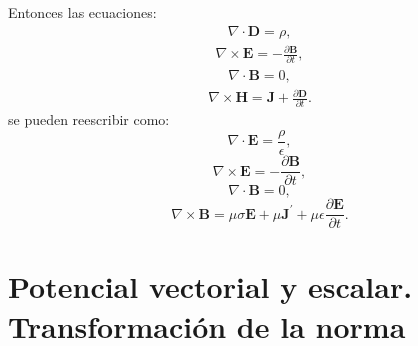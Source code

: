\documentclass[11pt,fleqn]{book} %
\begin{document}
Entonces las ecuaciones:
\begin{eqnarray*}
\nabla \cdot \textbf{D}=\rho,
 \end{eqnarray*}
 \begin{eqnarray*}
 \nabla \times \textbf{E}=-\frac{\partial \textbf{B}}{\partial t},
 \end{eqnarray*}
 \begin{eqnarray*}
 \nabla \cdot \textbf{B}=0,
 \end{eqnarray*}
 \begin{eqnarray*}
 \nabla \times \textbf{H}=\textbf{J}+\frac{\partial \textbf{D}}{\partial t}.
 \end{eqnarray*}
 se pueden reescribir como:
 \begin{equation}
\nabla\cdot \textbf{E}=\frac{\rho}{\epsilon},
 \end{equation}
\begin{equation}
\nabla \times \textbf{E}=-\frac{\partial \textbf{B}}{\partial t},
\end{equation}
\begin{equation}
\nabla \cdot \textbf{B}=0,
\end{equation}
\begin{equation}
\nabla \times \textbf{B}=\mu\sigma\textbf{E}+\mu\textbf{J}^{'}+\mu\epsilon\frac{\partial \textbf{E}}{\partial t}. \label{AmpereMateria}
\end{equation}

\section{Potencial vectorial y escalar. Transformaci\'on de la norma}
\end{document}
